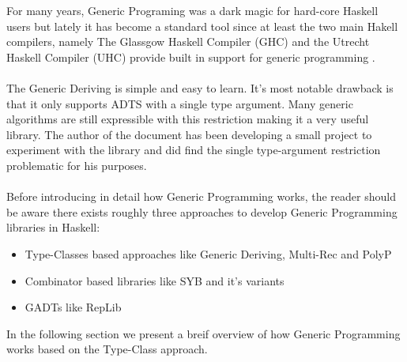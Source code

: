 \documentclass[8pt]{extarticle}
\begin{document}
For many years, Generic Programing was a dark magic for hard-core Haskell users but lately it has become a standard tool since at least the two main Hakell compilers, namely The Glassgow Haskell Compiler (GHC) and the Utrecht Haskell Compiler (UHC) provide built in support for generic programming \cite{SYB,GenericDeriving}. 
\\\\
The Generic Deriving \cite{GenericDeriving} is simple and easy to learn. It's most notable drawback is that it only supports ADTS with a single type argument. Many generic algorithms are still expressible with this restriction making it a very useful library. The author of the document has been developing a small project to experiment with the library \cite{Kwargs} and did find the single type-argument restriction problematic for his purposes.
\\\\
Before introducing in detail how Generic Programming works, the reader should be aware there exists roughly three approaches to develop Generic Programming libraries in Haskell:
\begin{itemize}
\item Type-Classes based approaches like Generic Deriving\cite{GenericDeriving}, Multi-Rec \cite{MultiRec} and PolyP\cite{PolyLib}
\item Combinator based libraries like SYB\cite{SYB} and it's variants
\item GADTs like RepLib\cite{RepLib}
\end{itemize}
In the following section we present a breif overview of how Generic Programming works based on the Type-Class approach.
\end{document}
